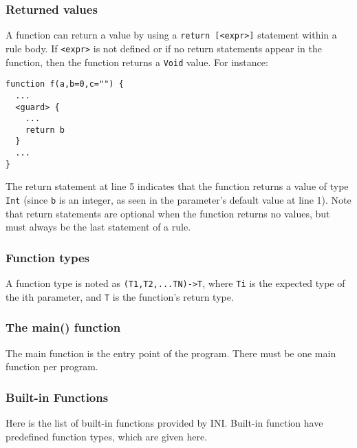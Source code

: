\documentclass[11pt]{article}
\begin{document}
\subsubsection{Returned values}

A function can return a value by using a \texttt{return [<expr>]} statement within a rule body. If \texttt{<expr>} is not defined or if no return statements appear in the function, then the function returns a \texttt{Void} value. For instance:

\begin{lstlisting}
function f(a,b=0,c="") {
  ...
  <guard> {
    ...
    return b
  }
  ...
}
\end{lstlisting}

The return statement at line 5 indicates that the function returns a value of type \texttt{Int} (since \texttt{b} is an integer, as seen in the parameter's default value at line 1). Note that return statements are optional when the function returns no values, but must always be the last statement of a rule.

\subsubsection{Function types}

A function type is noted as \texttt{(T1,T2,...TN)->T}, where \texttt{Ti} is the expected type of the ith parameter, and \texttt{T} is the function's return type.

\subsubsection{The main() function}

The main function is the entry point of the program. There must be one main function per program.

\subsubsection{Built-in Functions}

Here is the list of built-in functions provided by INI. Built-in function have predefined function types, which are given here.
\end{document}
